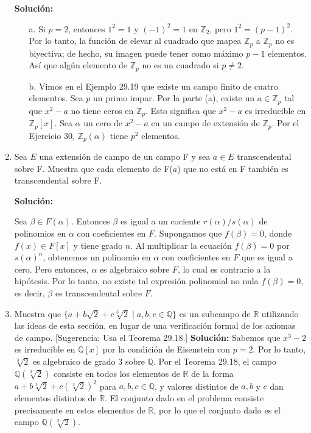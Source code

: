 \begin{enumerate}
    \textbf{Solución:}
    
    \begin{itemize}
        \item[a.]Si \( p = 2 \), entonces \( 1^2 = 1 \) y \( (-1)^2 = 1 \) en \( \mathbb{Z}_2 \), pero \( 1^2 = (p - 1)^2 \). Por lo tanto, la función de elevar al cuadrado que mapea \( \mathbb{Z}_p \) a \( \mathbb{Z}_p \) no es biyectiva; de hecho, su imagen puede tener como máximo \( p - 1 \) elementos. Así que algún elemento de \( \mathbb{Z}_p \) no es un cuadrado si \( p \neq 2 \).
        \item[b.]
        Vimos en el Ejemplo 29.19 que existe un campo finito de cuatro elementos. Sea \( p \) un primo impar. Por la parte (a), existe un \( a \in \mathbb{Z}_p \) tal que \( x^2 - a \) no tiene ceros en \( \mathbb{Z}_p \). Esto significa que \( x^2 - a \) es irreducible en \( \mathbb{Z}_p[x] \). Sea \( \alpha \) un cero de \( x^2 - a \) en un campo de extensión de \( \mathbb{Z}_p \). Por el Ejercicio 30, \( \mathbb{Z}_p(\alpha) \) tiene \( p^2 \) elementos.
    \end{itemize}
    
    \item  Sea $E$ una extensión de campo de un campo F y sea $a \in E$ transcendental sobre F. Muestra que cada elemento de F($a$) que no está en F también es transcendental sobre F.
    
    \textbf{Solución:}
    
    Sea \( \beta \in F(\alpha) \). Entonces \( \beta \) es igual a un cociente \( r(\alpha)/s(\alpha) \) de polinomios en \( \alpha \) con coeficientes en \( F \). Supongamos que \( f(\beta) = 0 \), donde \( f(x) \in F[x] \) y tiene grado \( n \). Al multiplicar la ecuación \( f(\beta) = 0 \) por \( s(\alpha)^n \), obtenemos un polinomio en \( \alpha \) con coeficientes en \( F \) que es igual a cero. Pero entonces, \( \alpha \) es algebraico sobre \( F \), lo cual es contrario a la hipótesis. Por lo tanto, no existe tal expresión polinomial no nula \( f(\beta) = 0 \), es decir, \( \beta \) es transcendental sobre \( F \).
    \item  Muestra que $\{a + b\sqrt{2} + c\sqrt[3]{2} \mid a, b, c \in \mathbb{Q}\}$ es un subcampo de $\mathbb{R}$ utilizando las ideas de esta sección, en lugar de una verificación formal de los axiomas de campo. [Sugerencia: Usa el Teorema 29.18.]
    \textbf{Solución:}
    Sabemos que \( x^3 - 2 \) es irreducible en \( \mathbb{Q}[x] \) por la condición de Eisenstein con \( p = 2 \). Por lo tanto, \( \sqrt[3]{2} \) es algebraico de grado 3 sobre \( \mathbb{Q} \). Por el Teorema 29.18, el campo \( \mathbb{Q}(\sqrt[3]{2}) \) consiste en todos los elementos de \( \mathbb{R} \) de la forma \( a + b\sqrt[3]{2} + c(\sqrt[3]{2})^2 \) para \( a, b, c \in \mathbb{Q} \), y valores distintos de \( a, b \) y \( c \) dan elementos distintos de \( \mathbb{R} \). El conjunto dado en el problema consiste precisamente en estos elementos de \( \mathbb{R} \), por lo que el conjunto dado es el campo \( \mathbb{Q}(\sqrt[3]{2}) \).
    

\end{enumerate}
